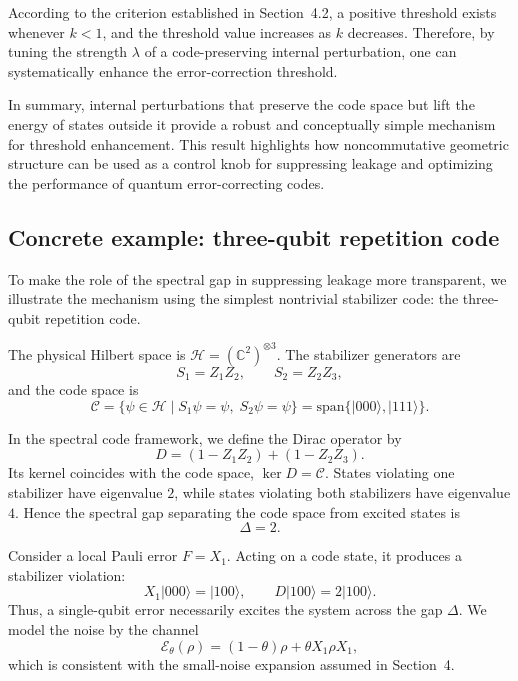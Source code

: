 \documentclass[12pt]{article}
\theoremstyle{definition} %
\theoremstyle{plain} %
\theoremstyle{remark} %
\theoremstyle{underline}
\begin{document}
According to the criterion established in Section~4.2, a positive threshold exists whenever $k<1$, and the threshold value increases as $k$ decreases.
Therefore, by tuning the strength $\lambda$ of a code-preserving internal perturbation, one can systematically enhance the error-correction threshold.

In summary, internal perturbations that preserve the code space but lift the energy of states outside it provide a robust and conceptually simple mechanism for threshold enhancement.
This result highlights how noncommutative geometric structure can be used as a control knob for suppressing leakage and optimizing the performance of quantum error-correcting codes.


\subsection{Concrete example: three-qubit repetition code}
\label{subsec:3qubit-example}

To make the role of the spectral gap in suppressing leakage more transparent, we illustrate the mechanism using the simplest nontrivial stabilizer code: the three-qubit repetition code.

The physical Hilbert space is $\mathcal H = (\mathbb C^2)^{\otimes 3}$.
The stabilizer generators are
\begin{equation}
    S_1 = Z_1 Z_2, \qquad S_2 = Z_2 Z_3 ,
\end{equation}
and the code space is
\begin{equation}
    \mathcal C = \{ \psi \in \mathcal H \mid S_1 \psi = \psi,\; S_2 \psi = \psi \}
    = \mathrm{span}\{ |000\rangle, |111\rangle \}.
\end{equation}

In the spectral code framework, we define the Dirac operator by
\begin{equation}
    D = (1 - Z_1 Z_2) + (1 - Z_2 Z_3).
\end{equation}
Its kernel coincides with the code space, $\ker D = \mathcal C$.
States violating one stabilizer have eigenvalue $2$, while states violating both stabilizers have eigenvalue $4$.
Hence the spectral gap separating the code space from excited states is
\begin{equation}
    \Delta = 2 .
\end{equation}

Consider a local Pauli error $F = X_1$.
Acting on a code state, it produces a stabilizer violation:
\begin{equation}
    X_1 |000\rangle = |100\rangle, \qquad
    D |100\rangle = 2 |100\rangle .
\end{equation}
Thus, a single-qubit error necessarily excites the system across the gap $\Delta$.
We model the noise by the channel
\begin{equation}
    \mathcal E_\theta(\rho) = (1-\theta)\rho + \theta X_1 \rho X_1 ,
\end{equation}
which is consistent with the small-noise expansion assumed in Section~4.
\end{document}
